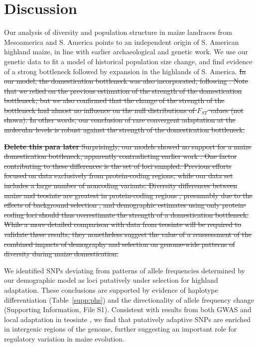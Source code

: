  \section*{Discussion}

Our analysis of diversity and population structure in maize landraces from Mesoamerica and S. America points to an independent origin of S. American highland maize, in line with earlier archaeological \cite[]{Piperno_2006_69,Perry_2006_16511492,Grobman_2012_22307642} and genetic \citep{vanHeerwaarden_2011_21189301} work. 
We use our genetic data to fit a model of historical population size change, and find 
evidence of a strong bottleneck followed by expansion in the highlands of S. America. 
\st{In our model, the domestication bottleneck was also incorporated, following \cite{Wright_2005_15919994}.
Note that we relied on the previous estimation of the strength of the domestication bottleneck, but
we also confirmed that the change of the strength of the bottleneck had almost no influence on the null distributions of $F_{ST}$ values (not shown).  In other words, our conclusion of rare convergent adaptation at the molecular levels is robust against the strength of the domestication bottleneck.}


\st{ {\bf Delete this para later} Surprisingly, our models showed no support for a maize domestication bottleneck, apparently contradicting earlier work \cite[]{Eyre-Walker_1998_9539756,Tenaillon_2004_15014173,Wright_2005_15919994}. 
One factor contributing to these differences is the set of loci sampled. 
Previous efforts focused on data exclusively from protein-coding regions, while our data set includes a large number of noncoding variants.
Diversity differences between maize and teosinte are greatest in protein-coding regions \citep{Hufford_2012_22660546}, presumably due to the effects of background selection \citep{Charlesworth_1993_8375663}, and demographic estimates using only protein-coding loci should thus overestimate the strength of a domestication bottleneck.
While a more detailed comparison with data from teosinte will be required to validate these results, they nonetheless suggest the value of a reassessment of the combined impacts of demography and selection on genome-wide patterns of diversity during maize domestication.}

We identified SNPs deviating from patterns of allele frequencies determined by our demographic model as loci putatively under selection for highland adaptation.
These conclusions are supported by evidence of haplotype differentiation (Table~\ref{supp:phs}) and the directionality of allele frequency change (Supporting Information, File S1).
Consistent with results from both GWAS \citep{Wallace_2014_25474422} and local adaptation in teosinte \citep{Pyhajarvi2013}, we find that putatively adaptive SNPs are enriched in intergenic regions of the genome, further suggesting an important role for regulatory variation in maize evolution. 

